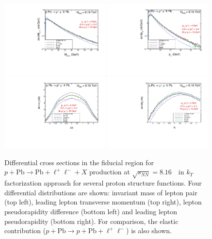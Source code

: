 \begin{figure}[!h]
 \includegraphics[width=0.49\textwidth]{figures_Marta/Mll-c-N.pdf}
  \includegraphics[width=0.49\textwidth]{figures_Marta/pt1-c-N.pdf}
 \includegraphics[width=0.49\textwidth]{figures_Marta/ydiff-c-NN.pdf}
  \includegraphics[width=0.49\textwidth]{figures_Marta/y1-c-N.pdf}
\caption{Differential cross sections in the fiducial region for $p+\textrm{Pb}\rightarrow \textrm{Pb} + \ell^+\ell^- + X$ production at $\sqrt{s_{N N}} = 8.16$~\TeV\ in $k_T$ factorization approach for several proton structure functions.
Four differential distributions are shown: invariant mass of lepton pair (top left), leading lepton transverse momentum (top right),
lepton pseudorapidity difference (bottom left) and leading lepton pseudorapidity (bottom right).
For comparison, the elastic contribution ($p+\textrm{Pb}\rightarrow p+ \textrm{Pb} + \ell^+\ell^-$) is also shown.
}
 \label{fig:kt_figures1}
\end{figure}


